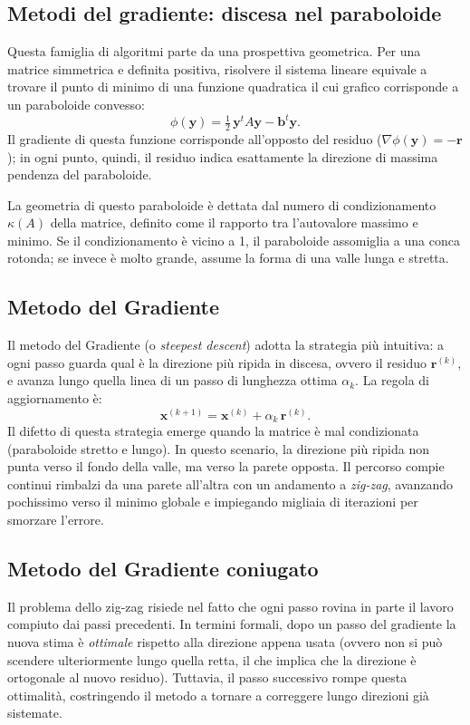 \documentclass[11pt,a4paper]{article}
\begin{document}
\subsection{Metodi del gradiente: discesa nel paraboloide}
Questa famiglia di algoritmi parte da una prospettiva geometrica. Per una
matrice simmetrica e definita positiva, risolvere il sistema lineare equivale a
trovare il punto di minimo di una funzione quadratica il cui grafico
corrisponde a un paraboloide convesso:
\[
\phi(\mathbf{y})=\tfrac12\,\mathbf{y}^{t}A\mathbf{y}-\mathbf{b}^{t}\mathbf{y}.
\]
Il gradiente di questa funzione corrisponde all'opposto del residuo
($\nabla\phi(\mathbf{y})=-\mathbf{r}$); in ogni punto, quindi, il residuo
indica esattamente la direzione di massima pendenza del paraboloide. 

La geometria di questo paraboloide è dettata dal numero di condizionamento
$\kappa(A)$ della matrice, definito come il rapporto tra l'autovalore massimo
e minimo. Se il condizionamento è vicino a 1, il paraboloide assomiglia a una
conca rotonda; se invece è molto grande, assume la forma di una valle lunga e
stretta.

\subsection{Metodo del Gradiente}
Il metodo del Gradiente (o \emph{steepest descent}) adotta la strategia più
intuitiva: a ogni passo guarda qual è la direzione più ripida in discesa,
ovvero il residuo $\mathbf{r}^{(k)}$, e avanza lungo quella linea di un passo
di lunghezza ottima $\alpha_k$. La regola di aggiornamento è:
\[
\mathbf{x}^{(k+1)}=\mathbf{x}^{(k)}+\alpha_k\,\mathbf{r}^{(k)}.
\]
Il difetto di questa strategia emerge quando la matrice è mal condizionata
(paraboloide stretto e lungo). In questo scenario, la direzione più ripida non
punta verso il fondo della valle, ma verso la parete opposta. Il percorso
compie continui rimbalzi da una parete all'altra con un andamento a
\emph{zig-zag}, avanzando pochissimo verso il minimo globale e impiegando
migliaia di iterazioni per smorzare l'errore.

\subsection{Metodo del Gradiente coniugato}
Il problema dello zig-zag risiede nel fatto che ogni passo rovina in parte il
lavoro compiuto dai passi precedenti. In termini formali, dopo un passo del
gradiente la nuova stima è \emph{ottimale} rispetto alla direzione appena
usata (ovvero non si può scendere ulteriormente lungo quella retta, il che
implica che la direzione è ortogonale al nuovo residuo). Tuttavia, il passo
successivo rompe questa ottimalità, costringendo il metodo a tornare a
correggere lungo direzioni già sistemate.
\end{document}
